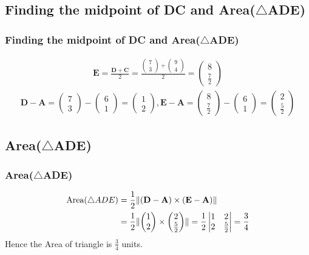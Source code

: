 \documentclass{beamer}
\providecommand{\brak}[1]{\ensuremath{\left(#1\right)}}
\theoremstyle{remark}
\providecommand{\norm}[1]{\lVert#1\rVert}
\newcommand{\myvec}[1]{\ensuremath{\begin{pmatrix}#1\end{pmatrix}}}
\let\vec\mathbf
\numberwithin{equation}{section}
\begin{document}
\subsection{Finding the midpoint of DC and Area($\triangle$ADE)}
\begin{frame}
\frametitle{Finding the midpoint of DC and Area($\triangle$ADE)}
\begin{align}
\vec{E}=\frac{\vec{D}+\vec{C}}2 =\frac{\myvec{7\\3}+\myvec{9\\4}}2=\myvec{8\\\frac{7}2} 
\end{align}
\begin{align}
\vec{D}-\vec{A}=\myvec{7\\3}-\myvec{6\\1}=\myvec{1\\2},\vec{E}-\vec{A}=\myvec{8\\\frac72}-\myvec{6\\1}=\myvec{2\\\frac52} 
\end{align}
\end{frame}

\subsection{Area($\triangle$ADE)}
\begin{frame}
\frametitle{Area($\triangle$ADE)}
\begin{align}
\text{Area\brak{\triangle ADE}}&=\frac12\norm{\brak{\vec{D}-\vec{A}}\times\brak{\vec{E}-\vec{A}}} \\
& =\frac12\norm{\myvec{1\\2}\times \myvec{2\\\frac52}} = \frac{1}{2}\mdet{1 & 2 \\ 2 & \frac{5}{2}}=\frac{3}{4} 
\end{align}
Hence the Area of triangle is $\frac{3}{4}$ units.
\end{frame}
\end{document}
